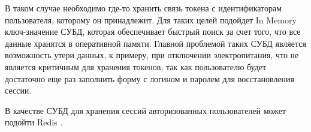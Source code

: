В таком случае необходимо где-то хранить связь токена с идентификаторам пользователя, которому он принадлежит. Для таких целей подойдет In Memory ключ-значение СУБД, которая обеспечивает быстрый поиск за счет того, что все данные хранятся в оперативной памяти. Главной проблемой таких СУБД является возможность утери данных, к примеру, при отключении электропитания, что не является критичным для хранения токенов, так как пользователю будет достаточно еще раз заполнить форму с логином и паролем для восстановления сессии.

В качестве СУБД для хранения сессий авторизованных пользователей может подойти Redis \cite{redis}.